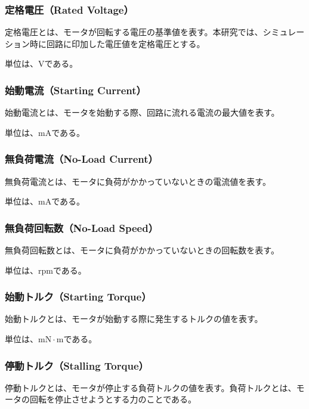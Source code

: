\subsubsection{定格電圧（Rated Voltage）}\label{sub:sub:dennatu}
定格電圧とは、モータが回転する電圧の基準値を表す。本研究では、シミュレーション時に回路に印加した電圧値を定格電圧とする。

単位は、$\mathrm{V}$である。
\subsubsection{始動電流（Starting Current）}\label{sub:sub:sidouden}
始動電流とは、モータを始動する際、回路に流れる電流の最大値を表す。

単位は、$\mathrm{mA}$である。

\subsubsection{無負荷電流（No-Load Current）}
無負荷電流とは、モータに負荷がかかっていないときの電流値を表す。

単位は、$\mathrm{mA}$である。

\subsubsection{無負荷回転数（No-Load Speed）}
無負荷回転数とは、モータに負荷がかかっていないときの回転数を表す。

単位は、$\mathrm{rpm}$である。

\subsubsection{始動トルク（Starting Torque）}
始動トルクとは、モータが始動する際に発生するトルクの値を表す。

単位は、$\mathrm{mN \cdot m}$である。


\subsubsection{停動トルク（Stalling Torque）}\label{sub:sub:teidoutoruku}
停動トルクとは、モータが停止する負荷トルクの値を表す。負荷トルクとは、モータの回転を停止させようとする力のことである。

